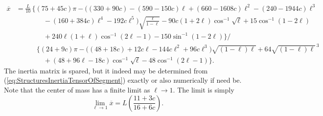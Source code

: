 \documentclass[11pt,dvipsnames]{thesis}
\begin{document}
\begin{align}
\overline{x} &= \frac{L}{10}\,\bigg\{(75 + 45c)\pi - \Big((330 + 90 c)  - (590 - 150c)\ell + (660 - 1608c)\ell^2 - (240 - 1944c)\ell^3 \nonumber\\
&\qquad\qquad - (160+384c)\ell^4 - 192c\ell^5\Big)\sqrt{\frac{\ell}{1 - \ell}} - 90c(1 + 2\ell)\cos^{-1}\!\sqrt{\ell} + 15\cos^{-1}(1 - 2\ell) \nonumber\\
&\qquad\qquad + 240\ell(1 + \ell)\cos^{-1}(2\ell - 1) - 150\sin^{-1}(1-2\ell) \bigg\} / \nonumber \\
&\qquad\quad  \bigg\{(24 + 9c)\pi - \big((48 + 18c) + 12c\ell - 144c\ell^2 + 96c\ell^3\big)\sqrt{(1-\ell)\ell} + 64\sqrt{(1-\ell)\ell}^{\,3} \nonumber \\
&\qquad\qquad + (48 + 96\ell - 18c)\cos^{-1}\sqrt{\ell} - 48\cos^{-1}(2\ell - 1)\bigg\}.
\end{align}
The inertia matrix is spared, but it indeed may be determined from (\ref{eq:StructuresInertiaTensorOfSegment}) exactly or also numerically if need be. Note that the center of mass has a finite limit as $\ell \to 1$. The limit is simply
\begin{equation}
\lim_{\ell \to 1} \overline{x} = L \left(\frac{11 + 3c}{16 + 6c}\right).
\end{equation}
\end{document}
